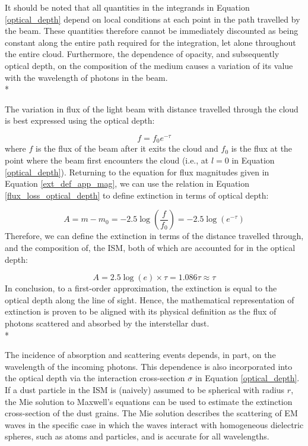 \documentclass[12pt, a4paper]{report}
\begin{document}
It should be noted that all quantities in the integrands in Equation \ref{optical_depth} depend on local conditions at each point in the path travelled by the beam. These quantities therefore cannot be immediately discounted as being constant along the entire path required for the integration, let alone throughout the entire cloud. Furthermore, the dependence of opacity, and subsequently optical depth, on the composition of the medium causes a variation of its value with the wavelength of photons in the beam.\\*

The variation in flux of the light beam with distance travelled through the cloud is best expressed using the optical depth:

\begin{equation}
f = f_{0} e^{-\tau}
\label{flux_loss_optical_depth}
\end{equation}
where $f$ is the flux of the beam after it exits the cloud and $f_{0}$ is the flux at the point where the beam first encounters the cloud (i.e., at $l = 0$ in Equation \ref{optical_depth}). Returning to the equation for flux magnitudes given in Equation \ref{ext_def_app_mag}, we can use the relation in Equation \ref{flux_loss_optical_depth} to define extinction in terms of optical depth:

\begin{equation}
A = m - m_{0} = -2.5\log\left(\frac{f}{f_{0}}\right) = -2.5\log(e^{-\tau})
\label{ext_optical_depth_mags}
\end{equation}
Therefore, we can define the extinction in terms of the distance travelled through, and the composition of, the ISM, both of which are accounted for in the optical depth:

\begin{equation}
A = 2.5\log(e) \times \tau = 1.086\tau \approx \tau
\label{ext_optical_depth}
\end{equation}
In conclusion, to a first-order approximation, the extinction is equal to the optical depth along the line of sight. Hence, the mathematical representation of extinction is proven to be aligned with its physical definition as the flux of photons scattered and absorbed by the interstellar dust. \\*

The incidence of absorption and scattering events depends, in part, on the wavelength of the incoming photons. This dependence is also incorporated into the optical depth via the interaction cross-section $\sigma$ in Equation \ref{optical_depth}. If a dust particle in the ISM is (naively) assumed to be spherical with radius $r$, the Mie solution \citep{1908AnP...330..377M} to Maxwell's equations can be used to estimate the extinction cross-section of the dust grains. The Mie solution describes the scattering of EM waves in the specific case in which the waves interact with homogeneous dielectric spheres, such as atoms and particles, and is accurate for all wavelengths.
\end{document}
